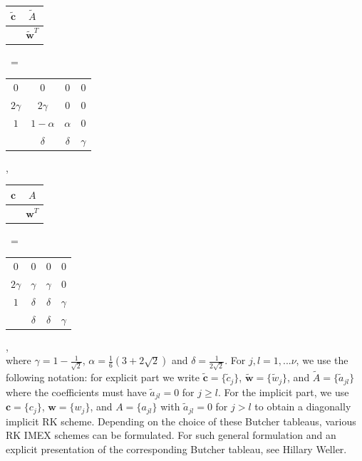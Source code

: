 \documentclass[a4paper, 12pt]{article}
\newcommand{\checkit}[1]{{\color{red}#1}}
\begin{document}
\begin{tabular}{c|c}
 $\mathbf{\tilde c}$ & $\tilde A$ \\ \hline
    & $\mathbf {\tilde w}^T$
\end{tabular} \ =
\begin{tabular}{c|ccc}
0         &  0             &   0       & 0  \\
$2\gamma$ &  $2\gamma$     &  0        & 0  \\
$1$       & $1 - \alpha$   & $\alpha$  & 0  \\ \hline
          & $\delta$       & $\delta$  & $\gamma$
\end{tabular}  , \qquad
\begin{tabular}{c|c}
 $\mathbf{c}$ & $A$ \\ \hline
    & $\mathbf {w}^T$
\end{tabular} \ =
\begin{tabular}{c|ccc}
0         &  0             &   0       & 0  \\
$2\gamma$ &  $\gamma$     &  $\gamma$        & 0  \\
$1$       & $\delta $   & $\delta$  & $\gamma$  \\ \hline
          & $\delta$       & $\delta$  & $\gamma$
\end{tabular}  , \\
where $\gamma = 1 - \frac{1}{\sqrt{2}}$, $\alpha = \frac{1}{6} (3 + 2\sqrt{2})$ and
$\delta =  \frac{1}{ 2 \sqrt{2}}$. For $j,l =1,...\nu$, we use the following notation: for explicit part we write
$\mathbf{\tilde c} = \{\tilde c_j\}$,
$\mathbf{\tilde w} = \{\tilde w_j\}$, and
$\tilde A = \{\tilde a_{jl}\}$ where the coefficients must have $\tilde a_{jl} = 0$ for $j \geq l$. For the implicit part, we use
$\mathbf{c} = \{c_j\}$,
$\mathbf{w} = \{w_j\}$, and $A = \{a_{jl}\}$ with $\tilde a_{jl} = 0$ for $j > l$ to obtain a diagonally implicit RK scheme. Depending on the choice of these Butcher tableaus, various RK IMEX schemes can be formulated. For such general formulation and an explicit presentation of the corresponding Butcher tableau, \checkit{see Hillary Weller.}
\end{document}
